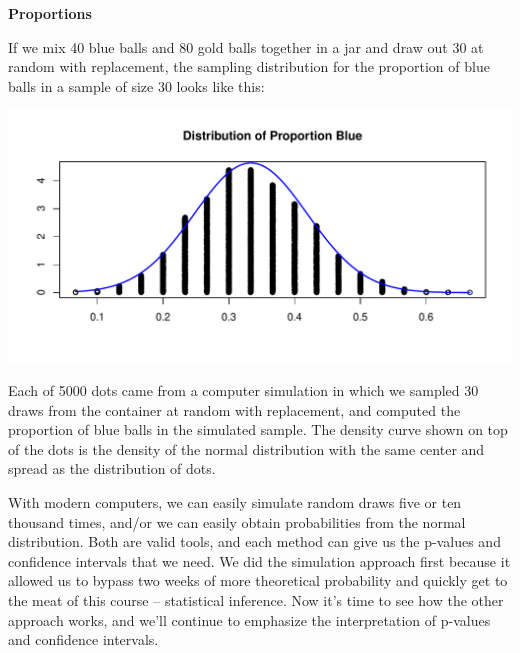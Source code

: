 \def\theTopic{Normal Proportions }
\def\dayNum{22 }


\begin{center}
   {\Large\bf  Proportions}
 \end{center}

If we mix 40 blue balls and 80 gold balls together in a jar and draw
out 30 at random with replacement, the sampling distribution for the
proportion of blue balls in a sample of size 30 looks like this:

\includegraphics[width=.8\linewidth]{../../plots/sample1.pdf}

Each of 5000 dots came from a computer simulation in which we sampled
30 draws from the container at random with replacement, and computed
the proportion of blue balls in the simulated sample.  The density
curve shown on top of the dots is the density of the normal
distribution with the same center and spread as the distribution of
dots.

With modern computers, we can easily simulate random draws five or ten
thousand times, and/or we can easily obtain probabilities from the
normal distribution.  Both are valid tools, and each method can give
us the p-values and confidence intervals that we need.  We did the
simulation approach first because it allowed us to bypass two weeks of
more theoretical probability and quickly get to the meat of this
course -- statistical inference.  Now it's time to see how the other
approach works, and we'll continue to emphasize the interpretation of
p-values and confidence intervals.  




